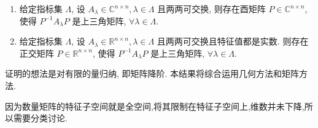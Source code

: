 \documentclass[../../main.tex]{subfiles}
\begin{document}
\begin{proposition}\label{proposition:一族两两可交换的复数(实数)域上的矩阵可同时酉(正交)上三角化}
\begin{enumerate}
\item 给定指标集 $\Lambda$, 设 $A_{\lambda} \in \mathbb{C}^{n \times n}, \lambda \in \Lambda$ 且两两可交换, 则存在酉矩阵 $P \in \mathbb{C}^{n \times n}$, 使得
\(
P^{-1}A_{\lambda}P
\)
是上三角矩阵, $\forall \lambda \in \Lambda$.

\item 给定指标集 $\Lambda$, 设 $A_{\lambda} \in \mathbb{R}^{n \times n}, \lambda \in \Lambda$ 且两两可交换且特征值都是实数. 则存在正交矩阵 $P \in \mathbb{R}^{n \times n}$, 使得
\(
P^{-1}A_{\lambda}P
\)
是上三角矩阵, $\forall \lambda \in \Lambda$.
\end{enumerate} 
\end{proposition}
\begin{note}
证明的想法是对有限的量归纳, 即矩阵降阶. 本结果将综合运用几何方法和矩阵方法.
\end{note}
\begin{remark}
因为数量矩阵的特征子空间就是全空间,将其限制在特征子空间上,维数并未下降,所以需要分类讨论.
\end{remark}
\end{document}
